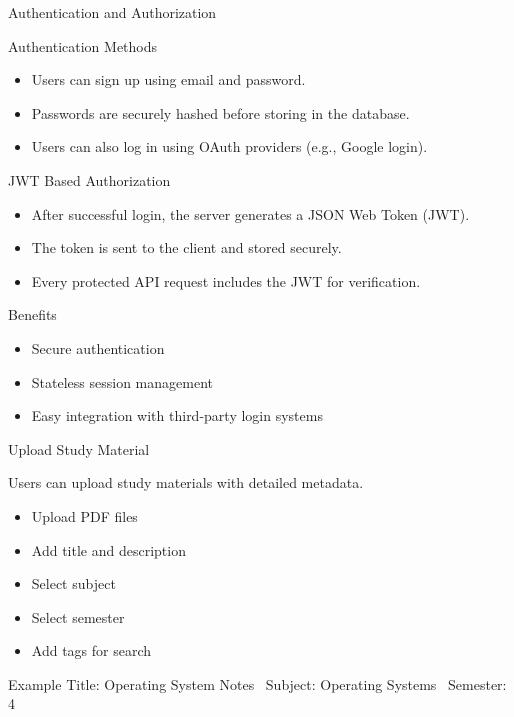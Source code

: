 \documentclass{beamer}
\begin{document}

\begin{frame}{Authentication and Authorization}

\begin{block}{Authentication Methods}
\begin{itemize}
\item Users can sign up using email and password.
\item Passwords are securely hashed before storing in the database.
\item Users can also log in using OAuth providers (e.g., Google login).
\end{itemize}
\end{block}

\begin{block}{JWT Based Authorization}
\begin{itemize}
\item After successful login, the server generates a JSON Web Token (JWT).
\item The token is sent to the client and stored securely.
\item Every protected API request includes the JWT for verification.
\end{itemize}
\end{block}

\begin{exampleblock}{Benefits}
\begin{itemize}
\item Secure authentication
\item Stateless session management
\item Easy integration with third-party login systems
\end{itemize}
\end{exampleblock}

\end{frame}




\begin{frame}{Upload Study Material}

Users can upload study materials with detailed metadata.

\begin{itemize}
\item Upload PDF files
\item Add title and description
\item Select subject
\item Select semester
\item Add tags for search
\end{itemize}

\begin{block}{Example}
Title: Operating System Notes \
Subject: Operating Systems \
Semester: 4
\end{block}

\end{frame}
\end{document}
